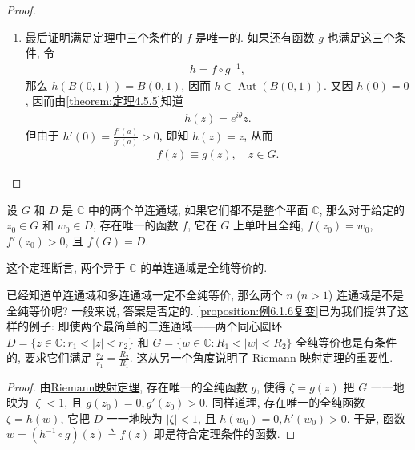 \documentclass[../../main.tex]{subfiles}%
\begin{document}
\begin{proof}
\begin{enumerate}[(1)]
\item 最后证明满足定理中三个条件的 \(f\) 是唯一的. 如果还有函数 \(g\) 也满足这三个条件, 令
\begin{align*}
h = f \circ g^{-1},
\end{align*}
那么 \(h(B(0, 1)) = B(0, 1)\), 因而 \(h \in \operatorname{Aut}(B(0, 1))\). 又因 \(h(0) = 0\), 因而由\cref{theorem:定理4.5.5}知道
\begin{align*}
h(z) = e^{i\theta} z.
\end{align*}
但由于 \(h'(0) = \frac{f'(a)}{g'(a)} > 0\), 即知 \(h(z) = z\), 从而
\begin{align*}
f(z) \equiv g(z), \quad z \in G.
\end{align*}
\end{enumerate}
\end{proof}

\begin{corollary}
设 \(G\) 和 \(D\) 是 \(\mathbb{C}\) 中的两个单连通域, 如果它们都不是整个平面 \(\mathbb{C}\), 那么对于给定的 \(z_0 \in G\) 和 \(w_0 \in D\), 存在唯一的函数 \(f\), 它在 \(G\) 上单叶且全纯, \(f(z_0) = w_0\), \(f'(z_0) > 0\), 且 \(f(G) = D\).
\end{corollary}
\begin{remark}
这个定理断言, 两个异于 \(\mathbb{C}\) 的单连通域是全纯等价的. 

已经知道单连通域和多连通域一定不全纯等价, 那么两个 \(n\) (\(n > 1\)) 连通域是不是全纯等价呢? 一般来说, 答案是否定的. \cref{proposition:例6.1.6复变}已为我们提供了这样的例子: 即使两个最简单的二连通域——两个同心圆环 \(D = \{ z \in \mathbb{C} : r_1 < |z| < r_2 \}\) 和 \(G = \{ w \in \mathbb{C} : R_1 < |w| < R_2 \}\) 全纯等价也是有条件的, 要求它们满足 \(\frac{r_2}{r_1} = \frac{R_2}{R_1}\). 这从另一个角度说明了 Riemann 映射定理的重要性.
\end{remark}
\begin{proof}
由\hyperref[theorem:Riemann映射定理]{Riemann映射定理}, 存在唯一的全纯函数 \(g\), 使得 \(\zeta = g(z)\) 把 \(G\) 一一地映为 \(|\zeta| < 1\), 且 \(g(z_0) = 0, g'(z_0) > 0\). 同样道理, 存在唯一的全纯函数 \(\zeta = h(w)\), 它把 \(D\) 一一地映为 \(|\zeta| < 1\), 且 \(h(w_0) = 0, h'(w_0) > 0\). 于是, 函数 \(w = (h^{-1} \circ g)(z) \triangleq f(z)\) 即是符合定理条件的函数.
\end{proof}
\end{document}
